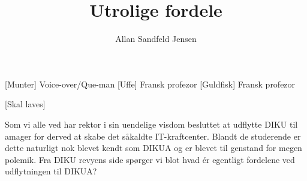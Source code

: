 \documentclass[a4paper,11pt]{article}
\title{Utrolige fordele}
\author{Allan Sandfeld Jensen}
\begin{document}
\maketitle

\begin{roles}
[Munter] Voice-over/Que-man
[Uffe] Fransk profezor
[Guldfisk] Fransk profezor
\end{roles}

\begin{props}
[Skal laves]
\end{props}

\begin{sketch}

 Som vi alle ved har rektor i sin uendelige visdom besluttet
at udflytte DIKU til amager for derved at skabe det såkaldte
IT-kraftcenter. Blandt de studerende er dette naturligt nok blevet
kendt som DIKUA og er blevet til genstand for megen polemik. Fra DIKU
revyens side spørger vi blot hvad \'er egentligt fordelene ved udflytningen til DIKUA?



\end{sketch}
\end{document}
